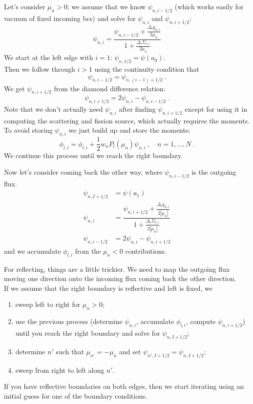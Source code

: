 \documentclass[12pt]{article}
\begin{document}
Let's consider $\mu_n > 0$; we assume that we know $\psi_{n,i-1/2}$ (which works easily for vacuum of fixed incoming bcs) and solve for $\psi_{n,i}$ and $\psi_{n,i+1/2}$:
\[
\psi_{n,i} = \dfrac{\psi_{n, i-1/2} + \frac{\Delta_i q_{n,i}}{2 \mu_n}}{1 + \frac{\Delta_i \Sigma_{t,i}}{2 \mu_n}}
\]
We start at the left edge with $i=1$: $\psi_{n,1/2} = \psi(a_0)$.\\
Then we follow through $i>1$ using the continuity condition that  
\[
\psi_{n,i-1/2} = \psi_{n,(i-1)+1/2}\:.
\]
We get $\psi_{n,i+1/2}$ from the diamond difference relation:
\[
\psi_{n,i+1/2} = 2\psi_{n,i} - \psi_{n,i-1/2}\:.
\]
Note that we don't actually need $\psi_{n,i}$ after finding $\psi_{n,i+1/2}$ except for using it in computing the scattering and fission source, which actually requires the moments.  \\
To avoid storing $\psi_{n,i}$ we just build up and store the moments:
\[
\phi_{l,i} = \phi_{l,i} + \frac{1}{2}w_nP_l(\mu_n) \psi_{n,i}\:, \quad n = 1, \dots, N\:.
\]
We continue this process until we reach the right boundary.

Now let's consider coming back the other way, where $\psi_{n,i-1/2}$ is the outgoing flux. 
\begin{align*}
\psi_{n,I+1/2} &= \psi(a_1)\\
\psi_{n,i} &= \dfrac{\psi_{n, i+1/2} + \frac{\Delta_i q_{n,i}}{2 |\mu_n|}}{1 + \frac{\Delta_i \Sigma_{t,i}}{2 |\mu_n|}}\\
\psi_{n,i-1/2} &= 2\psi_{n,i} - \psi_{n,i+1/2}
\end{align*}
and we accumulate $\phi_{l,i}$ from the $\mu_n < 0$ contributions.

For reflecting, things are a little trickier. We need to map the outgoing flux moving one direction onto the incoming flux coming back the other direction. \\
If we assume that the right boundary is reflective and left is fixed, we
%
\begin{enumerate}
\item sweep left to right for $\mu_n > 0$;
\item use the previous process (determine $\psi_{n,i}$, accumulate $\phi_{l,i}$, compute $\psi_{n,i+1/2}$) until you reach the right boundary and solve for $\psi_{n,I+1/2}$;
\item determine $n'$ such that $\mu_{n'} = -\mu_n$ and set $\psi_{n',I+1/2} = \psi_{n,I+1/2}$;
\item sweep from right to left along $n'$.
\end{enumerate}
%
If you have reflective boundaries on both edges, then we start iterating using an initial guess for one of the boundary conditions. 
\end{document}
